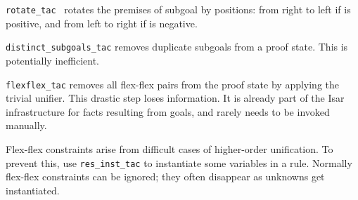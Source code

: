 \begin{isabellebody}
\begin{isamarkuptext}
  \begin{description}

  \item \verb|rotate_tac|~ rotates the premises of subgoal
   by  positions: from right to left if  is
  positive, and from left to right if  is negative.

  \item \verb|distinct_subgoals_tac| removes duplicate subgoals from a
  proof state.  This is potentially inefficient.

  \item \verb|flexflex_tac| removes all flex-flex pairs from the proof
  state by applying the trivial unifier.  This drastic step loses
  information.  It is already part of the Isar infrastructure for
  facts resulting from goals, and rarely needs to be invoked manually.

  Flex-flex constraints arise from difficult cases of higher-order
  unification.  To prevent this, use \verb|res_inst_tac| to instantiate
  some variables in a rule.  Normally flex-flex constraints can be
  ignored; they often disappear as unknowns get instantiated.


\end{description}
\end{isamarkuptext}
\end{isabellebody}
